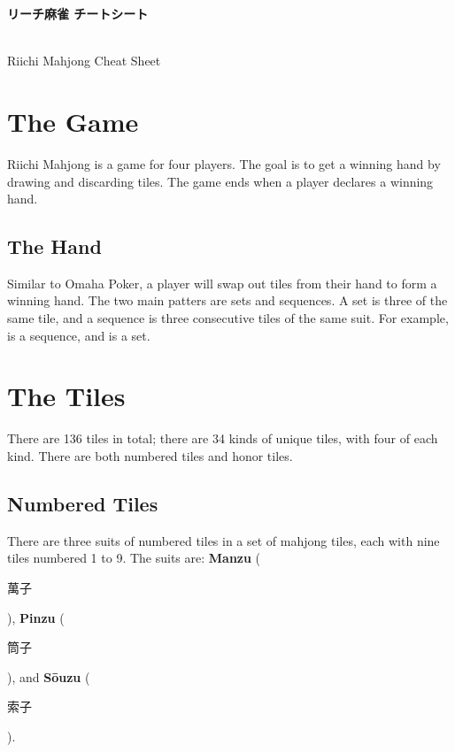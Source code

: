 \documentclass[8pt,landscape]{article}
\begin{document}
\begin{minipage}[t][.8\textheight][t]{\textwidth}
\begin{multicols*}{3}

    \begin{center}
        \begin{CJK}{UTF8}{min}
            \Large\textbf{リーチ麻雀 チートシート}
        \end{CJK}\\
        \small{Riichi Mahjong Cheat Sheet}
    \end{center}

    \section{The Game}
    Riichi Mahjong is a game for four players. 
    The goal is to get a winning hand by drawing and discarding tiles.
    The game ends when a player declares a winning hand.

    \subsection{The Hand}
    Similar to Omaha Poker, a player will swap out tiles from their hand to form a winning hand.
    The two main patters are sets and sequences.
    A set is three of the same tile, and a sequence is three consecutive tiles of the same suit.
    For example,  is a sequence, and  is a set.

    \section{The Tiles}
    There are 136 tiles in total; there are 34 kinds of unique tiles, with four of each kind.
    There are both numbered tiles and honor tiles.
    
    \subsection{Numbered Tiles}
    There are three suits of numbered tiles in a set of mahjong tiles, each with nine tiles numbered 1 to 9.
    The suits are: \textbf{Manzu} (\begin{CJK}{UTF8}{min}萬子\end{CJK}), 
    \textbf{Pinzu} (\begin{CJK}{UTF8}{min}筒子\end{CJK}), 
    and \textbf{Sōuzu} (\begin{CJK}{UTF8}{min}索子\end{CJK}).\\


\end{multicols*}
\end{minipage}
\end{document}
